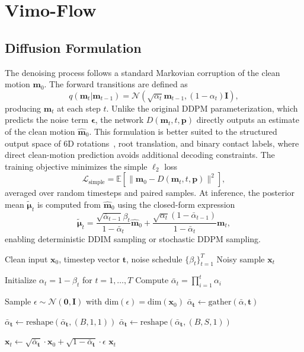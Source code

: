 \section{Vimo-Flow}
\label{sec:vimo_framework}

\subsection{Diffusion Formulation}
The denoising process follows a standard Markovian corruption of the clean motion $\mathbf{m}_0$. The forward transitions are defined as
\[
q(\mathbf{m}_t|\mathbf{m}_{t-1})=\mathcal{N}(\sqrt{\alpha_t}\mathbf{m}_{t-1},(1-\alpha_t)\mathbf{I}),
\]
producing $\mathbf{m}_t$ at each step $t$. Unlike the original DDPM parameterization, which predicts the noise term $\boldsymbol{\epsilon}$, the network $D(\mathbf{m}_t,t,\mathbf{p})$ directly outputs an estimate of the clean motion $\hat{\mathbf{m}}_0$. This formulation is better suited to the structured output space of 6D rotations~\cite{6drot2020}, root translation, and binary contact labels, where direct clean-motion prediction avoids additional decoding constraints. The training objective minimizes the simple $\ell_2$ loss
\[
\mathcal{L}_{\text{simple}}=\mathbb{E}[\|\mathbf{m}_0-D(\mathbf{m}_t,t,\mathbf{p})\|^2],
\]
averaged over random timesteps and paired samples. At inference, the posterior mean $\tilde{\boldsymbol{\mu}}_t$ is computed from $\hat{\mathbf{m}}_0$ using the closed-form expression
\[
\tilde{\boldsymbol{\mu}}_t=\frac{\sqrt{\bar{\alpha}_{t-1}}\beta_t}{1-\bar{\alpha}_t}\hat{\mathbf{m}}_0+\frac{\sqrt{\alpha_t}(1-\bar{\alpha}_{t-1})}{1-\bar{\alpha}_t}\mathbf{m}_t,
\]
enabling deterministic DDIM sampling or stochastic DDPM sampling.

\begin{algorithm}
\caption{Forward Diffusion Sampling}
\label{alg:forward_diffusion}
\begin{algorithmic}[1]
\Require Clean input $\mathbf{x}_0$, timestep vector $\mathbf{t}$, noise schedule $\{\beta_t\}_{t=1}^T$
\Ensure Noisy sample $\mathbf{x}_t$

\State Initialize $\alpha_t = 1 - \beta_t$ for $t = 1,\dots,T$
\State Compute $\bar{\alpha}_t = \prod_{i=1}^{t} \alpha_i$ 

\State Sample $\epsilon \sim \mathcal{N}(\mathbf{0}, \mathbf{I})$ with $\text{dim}(\epsilon) = \text{dim}(\mathbf{x}_0)$
\State $\bar{\alpha}_{\mathbf{t}} \leftarrow \text{gather}(\bar{\alpha}, \mathbf{t})$ 

    \State $\bar{\alpha}_{\mathbf{t}} \leftarrow \text{reshape}(\bar{\alpha}_{\mathbf{t}}, (B, 1, 1))$
\Else
    \State $\bar{\alpha}_{\mathbf{t}} \leftarrow \text{reshape}(\bar{\alpha}_{\mathbf{t}}, (B, S, 1))$ 
\EndIf

\State $\mathbf{x}_t \leftarrow \sqrt{\bar{\alpha}_{\mathbf{t}}} \cdot \mathbf{x}_0 + \sqrt{1 - \bar{\alpha}_{\mathbf{t}}} \cdot \epsilon$
\State \Return $\mathbf{x}_t$
\end{algorithmic}
\end{algorithm}

